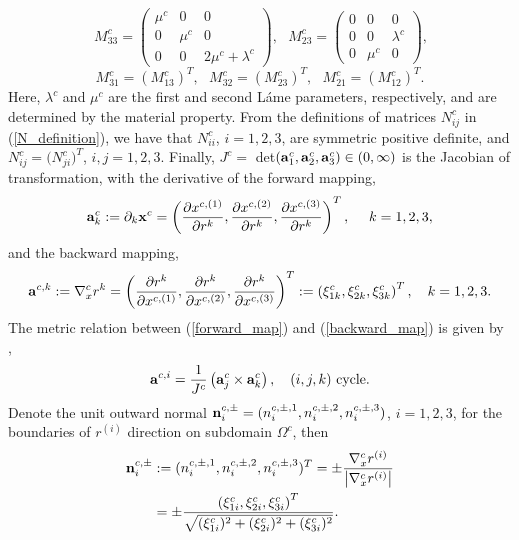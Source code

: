 \[\ M_{33}^c = \left(\begin{array}{ccc}
\mu^c & 0 & 0\\
0 & \mu^c & 0\\
0 & 0 & 2\mu^c+\lambda^c\end{array}\right),\ \ \ M_{23}^c = \left(\begin{array}{ccc}
0 & 0 & 0\\
0 & 0 & \lambda^c\\
0 & \mu^c & 0\end{array}\right),\]
\[ M_{31}^c = (M_{13}^c)^T, \ \ \  M_{32}^c =(M_{23}^c)^T, \ \ \ M_{21}^c =(M_{12}^c)^T.\]
Here, $\lambda^c$ and $\mu^c$ are the first and second L{\' {a}}me parameters, respectively, and are determined by the material property. From the definitions of matrices $N_{ij}^c$ in (\ref{N_definition}), we have that $N_{ii}^c$, $i = 1,2,3$, are symmetric positive definite, and $N_{ij}^c=\big(N_{ji}^c\big)^T$, $i,j=1,2,3$. Finally, $J^c =$ det$\left({\bf a}^c_1,{\bf a}^c_2,{\bf a}^c_3\right)\in (0,\infty)$ is the Jacobian of transformation, with the derivative of the forward mapping, 
\begin{equation}\label{forward_map}
{\bf a}_k^c := \partial_k{\bf x}^c  = \left(\frac{\partial x^{c,(1)}}{\partial r^{k}},\frac{\partial x^{c,(2)}}{\partial r^{k}},\frac{\partial x^{c,(3)}}{\partial r^{k}}\right)^T,\ \ \ \ k = 1,2,3,
\end{equation}
and the backward mapping,
\begin{equation}\label{backward_map}
{\bf a}^{c,k} := \nabla_x^c r^{k} = \left(\frac{\partial r^{k}}{\partial x^{c,(1)}},\frac{\partial r^{k}}{\partial x^{c,(2)}},\frac{\partial r^{k}}{\partial x^{c,(3)}}\right)^T := \left(\xi_{1k}^c,\xi_{2k}^c,\xi_{3k}^c\right)^T,\ \ \ k = 1,2,3.
\end{equation}
 The metric relation between (\ref{forward_map}) and (\ref{backward_map}) is given by \cite{thompson1985numerical},
\begin{equation*}
{\bf a}^{c,i} = \frac{1}{J^c}\left({\bf a}_j^c\times{\bf a}_k^c\right), \ \ \ (i,j,k) \ \mbox{cycle}.
\end{equation*}
Denote the unit outward normal ${\bf n}_i^{c,\pm} = (n_i^{c,\pm,1},n_i^{c,\pm,2},n_i^{c,\pm,3})$, $i = 1,2,3$, for the boundaries of $r^{(i)}$ direction on subdomain $\Omega^c$, then
\begin{align}\label{outward_normal}
{\bf n}_i^{c,\pm} &:= (n^{c,\pm,1}_i,n^{c,\pm,2}_i,n^{c,\pm,3}_i)^T = \pm \frac{\nabla_x^c r^{(i)}}{\left|\nabla_x^c r^{(i)}\right|} \nonumber\\
&= \pm\frac{ \left(\xi_{1i}^c,\xi_{2i}^c,\xi_{3i}^c\right)^T}{\sqrt{(\xi_{1i}^c)^2+(\xi_{2i}^c)^2+(\xi_{3i}^c)^2}}.
\end{align}
